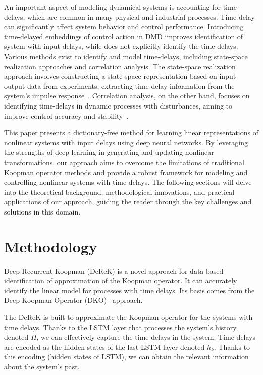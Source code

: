 \documentclass[conference]{IEEEtran}
\begin{document}
An important aspect of modeling dynamical systems is accounting for time-delays, which are common in many physical and industrial processes. Time-delay can significantly affect system behavior and control performance. Introducing time-delayed embeddings of control action in DMD improves identification of system with input delays, while does not explicitly identify the time-delays. Various methods exist to identify and model time-delays, including state-space realization approaches and correlation analysis. The state-space realization approach involves constructing a state-space representation based on input-output data from experiments, extracting time-delay information from the system's impulse response~\cite{Lima2015254}. Correlation analysis, on the other hand, focuses on identifying time-delays in dynamic processes with disturbances, aiming to improve control accuracy and stability~\cite{Li201792}.

This paper presents a dictionary-free method for learning linear representations of nonlinear systems with input delays using deep neural networks. By leveraging the strengths of deep learning in generating and updating nonlinear transformations, our approach aims to overcome the limitations of traditional Koopman operator methods and provide a robust framework for modeling and controlling nonlinear systems with time-delays. The following sections will delve into the theoretical background, methodological innovations, and practical applications of our approach, guiding the reader through the key challenges and solutions in this domain.

\section{Methodology}



Deep Recurrent Koopman (DeReK) is a novel approach for data-based identification of approximation of the Koopman operator. It can accurately identify the linear model for processes with time delays. Its basis comes from the Deep Koopman Operator (DKO)~\cite{lusch2018deep} approach.

The DeReK is built to approximate the Koopman operator for the systems with time delays. Thanks to the LSTM layer that processes the system's history denoted \(H\), we can effectively capture the time delays in the system. Time delays are encoded as the hidden states of the last LSTM layer denoted \(h_k\). Thanks to this encoding (hidden states of LSTM), we can obtain the relevant information about the system's past.
\end{document}
